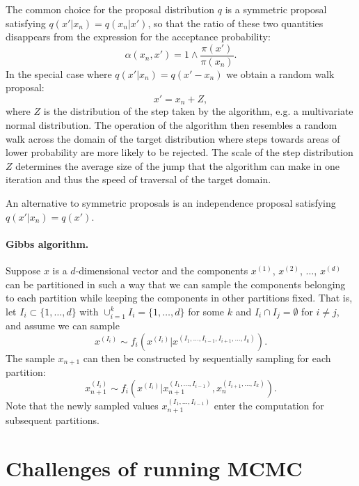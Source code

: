 \documentclass[11pt,a4paper]{report}
\begin{document}
The common choice for the proposal distribution $q$ is a symmetric proposal satisfying $q(x'|x_n) = q(x_n|x')$, so that the ratio of these two quantities disappears from the expression for the acceptance probability:
$$\alpha(x_n, x') = 1 \wedge \frac{\pi(x')}{\pi(x_n)}.$$
In the special case where $q(x'|x_n) = q(x' - x_n)$ we obtain a random walk proposal:
$$x' = x_n + Z,$$
where $Z$ is the distribution of the step taken by the algorithm, e.g. a multivariate normal distribution. The operation of the algorithm then resembles a random walk across the domain of the target distribution where steps towards areas of lower probability are more likely to be rejected. The scale of the step distribution $Z$ determines the average size of the jump that the algorithm can make in one iteration and thus the speed of traversal of the target domain.

An alternative to symmetric proposals is an independence proposal satisfying $q(x'|x_n) = q(x')$.


\paragraph{Gibbs algorithm.} Suppose $x$ is a $d$-dimensional vector and the components $x^{(1)}$, $x^{(2)}$, $\dots$, $x^{(d)}$ can be partitioned in such a way that we can sample the components belonging to each partition while keeping the components in other partitions fixed. That is, let $I_i \subset \{1, \dots, d\}$ with $\cup_{i=1}^k I_i = \{1, \dots, d\}$ for some $k$ and $I_i \cap I_j = \emptyset$ for $i \neq j$, and assume we can sample
$$x^{(I_i)} \sim f_i\left(x^{(I_i)} | x^{(I_1, \dots, I_{i-1}, I_{i+1}, \dots, I_k)}\right).$$
The sample $x_{n+1}$ can then be constructed by sequentially sampling for each partition:
$$x_{n+1}^{(I_i)} \sim f_i\left(x^{(I_i)} | x_{n+1}^{(I_1, \dots, I_{i-1})}, x_n^{(I_{i+1}, \dots, I_k)}\right).$$
Note that the newly sampled values $x_{n+1}^{(I_1, \dots, I_{i-1})}$ enter the computation for subsequent partitions.




\section{Challenges of running MCMC}
\end{document}
